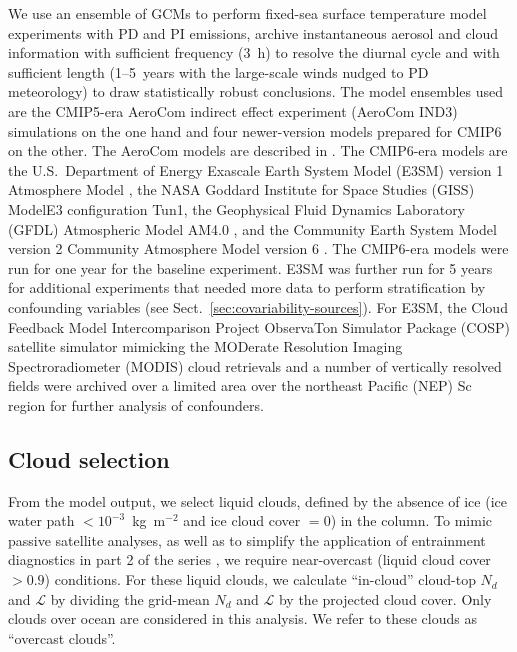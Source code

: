 \documentclass[acp, manuscript]{copernicus}\usepackage[]{graphicx}\usepackage[]{xcolor}
\newcommand\nd{\ensuremath{N_d}}
\newcommand\lwp{\ensuremath{\mathcal L}}
\begin{document}
We use an ensemble of GCMs to perform fixed-sea surface temperature
model experiments with PD and PI emissions,
archive instantaneous aerosol and cloud information with sufficient frequency
(3~h) to resolve the diurnal cycle and with sufficient length (1--5~years with the
large-scale winds nudged to PD meteorology) to draw statistically
robust conclusions.  The model ensembles used are the CMIP5-era AeroCom indirect
effect experiment (AeroCom IND3) simulations on the one hand and four newer-version models
prepared for CMIP6 on the other.  The AeroCom models are described in
\citet{Zhang2016,Ghan2016}.  The CMIP6-era models are the U.S.~Department of
Energy Exascale Earth System Model (E3SM) version 1 Atmosphere Model \citep[EAMv1;][]{Rasch2019},
the NASA Goddard Institute for Space Studies (GISS) ModelE3 \citep{Cesana2019,Cesana2021} configuration Tun1,
the Geophysical Fluid Dynamics Laboratory (GFDL) Atmospheric Model AM4.0
\citep{Zhao2018},
and the Community Earth System Model version 2 Community Atmosphere
Model version 6 \citep[CESM2-CAM6;][]{Gettelman2019}.
The CMIP6-era models were run for one year for the baseline
experiment.  E3SM was further run for 5 years for additional experiments
that needed more data to perform
stratification by confounding variables (see Sect.~\ref{sec:covariability-sources}).  For E3SM, the Cloud Feedback Model Intercomparison Project ObservaTon Simulator Package (COSP) satellite simulator \citep{Pincus2012,Swales2018} mimicking the MODerate Resolution Imaging Spectroradiometer (MODIS) cloud retrievals \citep{platnick2017} and a number of vertically resolved
fields were archived over a limited area over the northeast Pacific (NEP)
Sc region for further
analysis of confounders.

\subsection{Cloud selection}

From the model output, we select liquid clouds, defined by the absence of ice
(ice water path $<10^{-3}$~kg~m$^{-2}$ and ice cloud cover $=0$) in the column.  To mimic passive
satellite analyses, as well as to simplify the application of entrainment
diagnostics in part 2 of the series \citep{Muelmenstaedt2023b},
we require near-overcast (liquid cloud cover $>0.9$) conditions.
For these liquid clouds, we calculate ``in-cloud'' cloud-top \nd{} and \lwp{} by dividing
the grid-mean \nd{} and \lwp{} by the projected cloud cover.  Only clouds over ocean
are considered in this analysis.  We refer to
these clouds as ``overcast clouds''.
\end{document}
